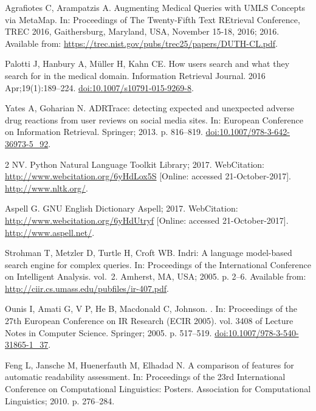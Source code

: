 \documentclass[10pt,a4paper]{article}
\begin{document}
\begin{thebibliography}{10}
	Agrafiotes C, Arampatzis A.
	\newblock Augmenting Medical Queries with {UMLS} Concepts via MetaMap.
	\newblock In: Proceedings of The Twenty-Fifth Text REtrieval Conference, {TREC}
	2016, Gaithersburg, Maryland, USA, November 15-18, 2016; 2016. Available
	from: \url{https://trec.nist.gov/pubs/trec25/papers/DUTH-CL.pdf}.
	
	Palotti J, Hanbury A, M{\"u}ller H, Kahn CE.
	\newblock How users search and what they search for in the medical domain.
	\newblock Information Retrieval Journal. 2016 Apr;19(1):189--224.
	\newblock \href {http://dx.doi.org/10.1007/s10791-015-9269-8}
	{doi:10.1007/s10791-015-9269-8}.
	
	Yates A, Goharian N.
	\newblock ADRTrace: detecting expected and unexpected adverse drug reactions
	from user reviews on social media sites.
	\newblock In: European Conference on Information Retrieval. Springer; 2013. p.
	816--819.
	\newblock \href {http://dx.doi.org/10.1007/978-3-642-36973-5\_92}
	{doi:10.1007/978-3-642-36973-5\_92}.
	
	2 NV. Python Natural Language Toolkit Library; 2017.
	\newblock WebCitation: \url{http://www.webcitation.org/6yHdLox5S} [Online:
	accessed 21-October-2017].
	\newblock \url{http://www.nltk.org/}.
	
	Aspell G. GNU English Dictionary Aspell; 2017.
	\newblock WebCitation: \url{http://www.webcitation.org/6yHdUtryf} [Online:
	accessed 21-October-2017].
	\newblock \url{http://www.aspell.net/}.
	
	Strohman T, Metzler D, Turtle H, Croft WB.
	\newblock Indri: A language model-based search engine for complex queries.
	\newblock In: Proceedings of the International Conference on Intelligent
	Analysis. vol.~2. Amherst, MA, USA; 2005. p. 2--6.
	\newblock Available from: \url{http://ciir.cs.umass.edu/pubfiles/ir-407.pdf}.
	
	Ounis I, Amati G, V P, He B, Macdonald C, Johnson.
	.
	\newblock In: {Proceedings of the 27th European Conference on IR Research (ECIR
		2005)}. vol. 3408 of Lecture Notes in Computer Science. Springer; 2005. p.
	517--519.
	\newblock \href {http://dx.doi.org/10.1007/978-3-540-31865-1\_37}
	{doi:10.1007/978-3-540-31865-1\_37}.
	
	Feng L, Jansche M, Huenerfauth M, Elhadad N.
	\newblock A comparison of features for automatic readability assessment.
	\newblock In: Proceedings of the 23rd International Conference on Computational
	Linguistics: Posters. Association for Computational Linguistics; 2010. p.
	276--284.
	

\end{thebibliography}
\end{document}
